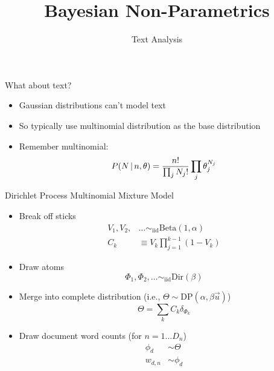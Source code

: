 \documentclass[compress]{beamer}
\title{Bayesian Non-Parametrics}
\date{Text Analysis}
\begin{document}
\frame{\titlepage
}

\begin{frame}{What about text?}

  \begin{itemize}
    \item Gaussian distributions can't model text 
    \item So typically use multinomial distribution as the base distribution
    \item Remember multinomial:
      \begin{equation}
        P(N \, | \, n, \theta) = \frac{n!}{\prod_j N_j!} \prod_j \theta_j^{N_j}
      \end{equation}
  \end{itemize}

\end{frame}

\begin{frame}{Dirichlet Process Multinomial Mixture Model}
\begin{footnotesize}
       \begin{itemize}
		\item Break off sticks
                  \begin{align}
                    V_1, V_2, & \dots \sim_{\mbox{iid}} \mbox{Beta}(1,
                    \alpha) \\
                    C_k & \equiv V_k \prod_{j=1}^{k-1} (1 - V_k)
                  \end{align}
		\pause
		\item Draw atoms
                  \begin{equation}
                    \Phi_1, \Phi_2, \dots \sim_{\mbox{iid}} \mbox{Dir}(\beta)
                  \end{equation}
		\pause
		\item Merge into complete distribution (i.e., $\Theta
                  \sim \mbox{DP}(\alpha, \beta \vec u)$)
                  \begin{equation}
                    \Theta = \sum_k C_k \delta_{\Phi_k}
                  \end{equation}
                  \pause
                  \item Draw document word counts (for $n=1\dots D_n$)
                    \begin{align}
                      \phi_d & \sim \Theta \\
                      w_{d,n} & \sim \phi_d
                    \end{align}
       \end{itemize}
\end{footnotesize}
\end{frame}
\end{document}
